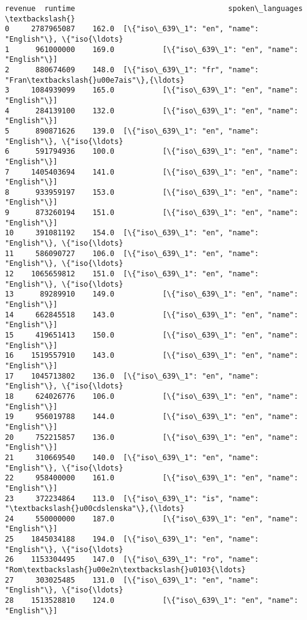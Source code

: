 \documentclass[11pt]{article}
\begin{document}
\begin{Verbatim}[commandchars=\\\{\}]
         revenue  runtime                                   spoken\_languages  \textbackslash{}
0     2787965087    162.0  [\{"iso\_639\_1": "en", "name": "English"\}, \{"iso{\ldots}   
1      961000000    169.0           [\{"iso\_639\_1": "en", "name": "English"\}]   
2      880674609    148.0  [\{"iso\_639\_1": "fr", "name": "Fran\textbackslash{}u00e7ais"\},{\ldots}   
3     1084939099    165.0           [\{"iso\_639\_1": "en", "name": "English"\}]   
4      284139100    132.0           [\{"iso\_639\_1": "en", "name": "English"\}]   
5      890871626    139.0  [\{"iso\_639\_1": "en", "name": "English"\}, \{"iso{\ldots}   
6      591794936    100.0           [\{"iso\_639\_1": "en", "name": "English"\}]   
7     1405403694    141.0           [\{"iso\_639\_1": "en", "name": "English"\}]   
8      933959197    153.0           [\{"iso\_639\_1": "en", "name": "English"\}]   
9      873260194    151.0           [\{"iso\_639\_1": "en", "name": "English"\}]   
10     391081192    154.0  [\{"iso\_639\_1": "en", "name": "English"\}, \{"iso{\ldots}   
11     586090727    106.0  [\{"iso\_639\_1": "en", "name": "English"\}, \{"iso{\ldots}   
12    1065659812    151.0  [\{"iso\_639\_1": "en", "name": "English"\}, \{"iso{\ldots}   
13      89289910    149.0           [\{"iso\_639\_1": "en", "name": "English"\}]   
14     662845518    143.0           [\{"iso\_639\_1": "en", "name": "English"\}]   
15     419651413    150.0           [\{"iso\_639\_1": "en", "name": "English"\}]   
16    1519557910    143.0           [\{"iso\_639\_1": "en", "name": "English"\}]   
17    1045713802    136.0  [\{"iso\_639\_1": "en", "name": "English"\}, \{"iso{\ldots}   
18     624026776    106.0           [\{"iso\_639\_1": "en", "name": "English"\}]   
19     956019788    144.0           [\{"iso\_639\_1": "en", "name": "English"\}]   
20     752215857    136.0           [\{"iso\_639\_1": "en", "name": "English"\}]   
21     310669540    140.0  [\{"iso\_639\_1": "en", "name": "English"\}, \{"iso{\ldots}   
22     958400000    161.0           [\{"iso\_639\_1": "en", "name": "English"\}]   
23     372234864    113.0  [\{"iso\_639\_1": "is", "name": "\textbackslash{}u00cdslenska"\},{\ldots}   
24     550000000    187.0           [\{"iso\_639\_1": "en", "name": "English"\}]   
25    1845034188    194.0  [\{"iso\_639\_1": "en", "name": "English"\}, \{"iso{\ldots}   
26    1153304495    147.0  [\{"iso\_639\_1": "ro", "name": "Rom\textbackslash{}u00e2n\textbackslash{}u0103{\ldots}   
27     303025485    131.0  [\{"iso\_639\_1": "en", "name": "English"\}, \{"iso{\ldots}   
28    1513528810    124.0           [\{"iso\_639\_1": "en", "name": "English"\}]   

\end{Verbatim}
\end{document}
